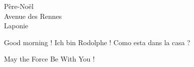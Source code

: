 \documentclass[12pt]{lettre}
\begin{document}
	\begin{letter}{Père-Noël\\
				   Avenue des Rennes\\
				   Laponie\\
                  }
      \date{le 30 avril 2017}
	\opening{Good morning ! Ich bin Rodolphe ! Como esta dans la casa ?}
	\lipsum[1-2]
	\closing{May the Force Be With You !}
	\end{letter}
\end{document}
